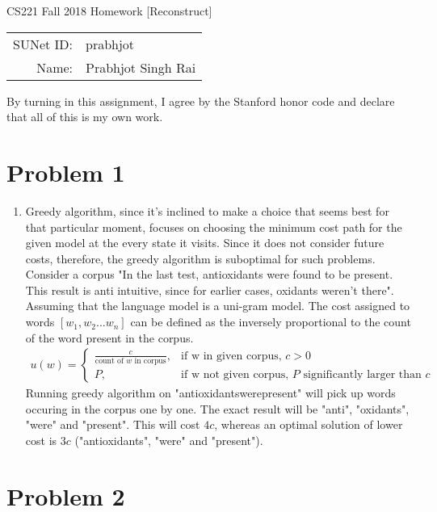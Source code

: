 \documentclass[12pt]{article}
\begin{document}
\begin{center}
{\Large CS221 Fall 2018 Homework [Reconstruct]}

\begin{tabular}{rl}
SUNet ID: & prabhjot \\
Name: & Prabhjot Singh Rai
\end{tabular}
\end{center}

By turning in this assignment, I agree by the Stanford honor code and declare
that all of this is my own work.

\section*{Problem 1}

\begin{enumerate}[label=(\alph*)]
  \item Greedy algorithm, since it's inclined to make a choice that seems best for that particular moment, focuses on choosing the minimum cost path for the given model at the every state it visits. Since it does not consider future costs, therefore, the greedy algorithm is suboptimal for such problems. Consider a corpus "In the last test, antioxidants were found to be present. This result is anti intuitive, since for earlier cases, oxidants weren't there". Assuming that the language model is a uni-gram model. The cost assigned to words $[w_1, w_2 ... w_n]$ can be defined as the inversely proportional to the count of the word present in the corpus. \\
  \begin{align*}
  u(w) = \begin{cases} 
  \frac{c}{\text{count of $w$ in corpus}}, & \text{if w in given corpus, $c > 0$} \\
  P, & \text{if w not given corpus, $P$ significantly larger than $c$}
  \end{cases}
  \end{align*}
  Running greedy algorithm on "antioxidantswerepresent" will pick up words occuring in the corpus one by one. The exact result will be "anti", "oxidants", "were" and "present". This will cost $4c$, whereas an optimal solution of lower cost is $3c$ ("antioxidants", "were" and "present").
  
\end{enumerate}

\section*{Problem 2}
\end{document}
